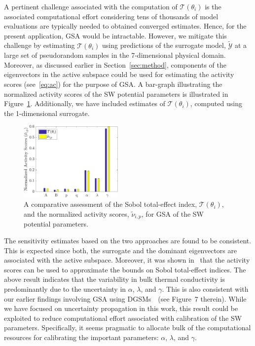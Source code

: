 A pertinent challenge associated with  the computation of $\mathcal{T}(\theta_i)$ is the associated
computational effort considering tens of thousands of model evaluations are typically needed to obtained
converged estimates. Hence, for the present application, GSA would be intractable. However, we mitigate
this challenge by estimating $\mathcal{T}(\theta_i)$ using predictions of the surrogate model, 
$\tilde{\mathcal{Y}}$ at a large set of pseudorandom samples in the 7-dimensional physical domain.  
Moreover, as discussed earlier in Section~\ref{sec:method}, components of the eigenvectors in the
active subspace could be used for estimating the activity scores (see~\eqref{eq:ac}) for the purpose of GSA.
A bar-graph illustrating the normalized activity scores of the SW potential parameters is illustrated in
Figure~\ref{fig:gsa}. Additionally, we have included estimates of $\mathcal{T}(\theta_i)$, computed using
the 1-dimensional surrogate. 
%
\begin{figure}[htbp]
\begin{center}
\includegraphics[width=0.45\textwidth]{./Figures/free_as_gsa}
\caption{A comparative assessment of the Sobol total-effect index, $\mathcal{T}(\theta_i)$, and the normalized
activity scores, $\tilde{\nu}_{i,p}$, for GSA of the SW potential parameters.}
\label{fig:gsa}
\end{center}
\end{figure}
%
The sensitivity estimates based on the two approaches are found to be consistent. This is expected since
both, the surrogate and the dominant eigenvectors are associated with the active subspace. Moreover, it
was shown in~\cite{Vohra:2018c} that the activity scores can be used to approximate the bounds on Sobol
total-effect indices. The above result indicates that the variability in bulk thermal conductivity is predominantly
due to the uncertainty in $\alpha$, $\lambda$, and $\gamma$. This is also consistent with our earlier
findings involving GSA using DGSMs~\cite{Vohra:2018b}~(see Figure~7 therein). While we have focused on uncertainty
propagation in this work, this result could be exploited to reduce computational effort associated with
calibration of the SW parameters. Specifically, it seems pragmatic to allocate bulk of the computational
resources for calibrating the important parameters: $\alpha$, $\lambda$, and $\gamma$.  
